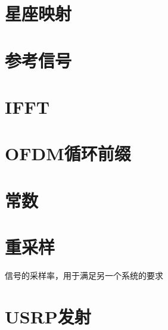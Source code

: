 	\section{星座映射}
	\section{参考信号}
	\section{IFFT}
	\section{OFDM循环前缀}
	\section{常数}
	\section{重采样}
		\par 信号的采样率，用于满足另一个系统的要求
	\section{USRP发射}

